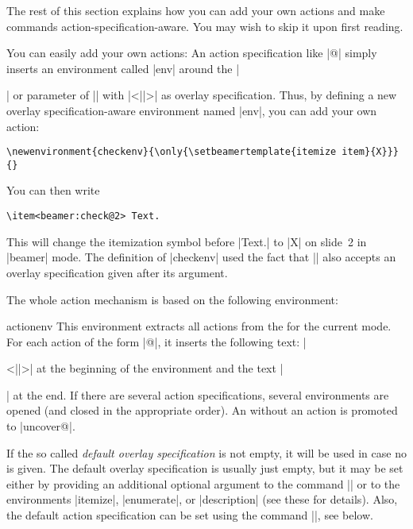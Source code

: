 \begin{original...}
The rest of this section explains how you can add your own actions and make commands action-specification-aware. You may wish to skip it upon first reading.

You can easily add your own actions: An action specification like |@| simply inserts an environment called |env| around the |\item| or parameter of |\action| with |<||>| as overlay specification. Thus, by defining a new overlay specification-aware environment named |env|, you can add your own action:
\begin{verbatim}
\newenvironment{checkenv}{\only{\setbeamertemplate{itemize item}{X}}}{}
\end{verbatim}

You can then write
\begin{Verbatim}
\item<beamer:check@2> Text.
\end{Verbatim}

This will change the itemization symbol before |Text.| to |X| on slide~2 in |beamer| mode. The definition of |checkenv| used the fact that |\only| also accepts an overlay specification given after its argument.

The whole action mechanism is based on the following environment:

\begin{environment}{{actionenv}}
  This environment extracts all actions from the  for the current mode. For each action of the form |@|, it inserts the following text: |\begin{|\meta{action}|env}<||>| at the beginning of the environment and the text |\end{|\meta{action}|env}| at the end. If there are several action specifications, several environments are opened (and closed in the appropriate order). An  without an action is promoted to |uncover@|.

  If the so called \emph{default overlay specification} is not empty, it will be used in case no  is given. The default overlay specification is usually just empty, but it may be set either by providing an additional optional argument to the command |\frame| or to the environments |itemize|, |enumerate|, or |description| (see these for details). Also, the default action specification can be set using the command |\beamerdefaultoverlayspecification|, see below.


\end{environment}
\end{original...}
